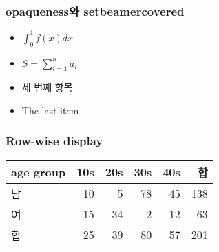 \documentclass{beamer}
\begin{document}
\begin{frame}
\frametitle{opaqueness와 setbeamercovered}

\begin{itemize}
\item<1> $\int_0^1 f(x) dx$
\item<2> $S = \sum_{i=1}^n a_i$
\item<3> 세 번째 항목
\item<4> The last item
\end{itemize}
\end{frame}

\begin{frame}
\frametitle{Row-wise display}
\begin{tabular}{l| r<{\onslide<2->} r<{\onslide<3->} r<{\onslide<4->} r<{\onslide<5>} r} \hline
age group & 10s & 20s & 30s & 40s & 합 \\ \hline
남 & 10 & 5 & 78 & 45 & 138 \\
여 & 15 & 34 & 2 & 12 & 63 \\
합 & 25 & 39 & 80 & 57 & 201 \\ \hline
\end{tabular}
\end{frame}
\end{document}
